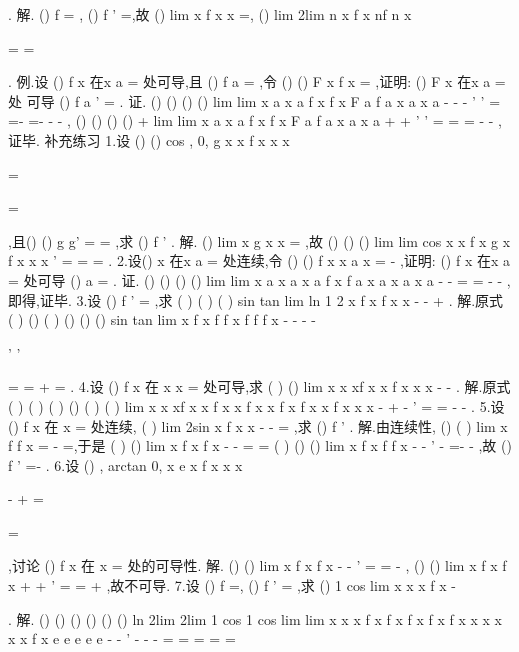 . 
解.
()
f
=
,
()
f '
=,故
()
lim
x
f x
x
\to 
=,
()
lim
2lim
n
x
f x
nf
n
x
\to \infty 
\to 

=
=




. 
\textcolor{lyred}{例}.设
()
f x 在x
a
=
处可导,且
()
f a =
,令
()
()
F x
f x
=
,证明:
()
F x 在x
a
=
处 
可导
()
f
a
'
\Leftrightarrow 
=
. 
证.
()
()
()
()
lim
lim
x
a
x
a
f x
f x
F
a
f
a
x
a
x
a
-
-
-
\to 
\to 
'
'
=
=-
=-
-
-
, 
()
()
()
()
+
lim
lim
x
a
x
a
f x
f x
F
a
f
a
x
a
x
a
+
+
\to 
\to 
'
'
=
=
=
-
-
,证毕. 
\textcolor{lyred}{补充练习 }
1.设
()
()
cos
,
0,
g x
x
f x
x
x

\neq 

=

=

,且()
()
g
g'
=
=
,求
()
f '
. 
解.
()
lim
x
g x
x
\to 
=
,故
()
()
()
lim
lim
cos
x
x
f x
g x
f
x
x
x
\to 
\to 
'
=
=
=
. 
2.设()
x
\varphi 
在x
a
=
处连续,令
()
()
f x
x
a
x
\varphi 
=
-
,证明:
()
f x 在x
a
=
处可导\Leftrightarrow  
()
a
\varphi 
=
. 
证.
()
()
()
()
lim
lim
x
a
x
a
x
a
f x
f a
x
a
x
a
x
a \varphi 
\varphi 
\to 
\to 
-
-
=
=\pm 
-
-
,即得,证毕. 
3.设
()
f '
=
,求
(
)
(
)
(
)
sin
tan
lim
ln 1 2
x
f
x
f
x
x
\to 
-
-
+
. 
解.原式
(
)
()
(
)
()
()
()
sin
tan
lim
x
f
x
f
f
x
f
f
f
x
\to 
-
-
-
-


'
'


=
=
+
=
. 
4.设
()
f x 在
x
x
=
处可导,求
(
)
()
lim
x
x
xf x
x f x
x
x
\to 
-
-
. 
解.原式
(
)
(
)
(
)
()
(
)
(
)
lim
x
x
xf x
x f x
x f x
x f x
f x
x f
x
x
x
\to 
-
+
-
'
=
=
-
-
. 
5.设
()
f x 在
x =
处连续,
(
)
lim
2sin
x
f
x
x
\to 
-
-
=
,求
()
f '
. 
解.由连续性,
()
(
)
lim
x
f
f
x
\to 
=
-
=,于是
(
)
()
lim
x
f
x
f
x
\to 
-
-
=
= 
(
)
()
()
lim
x
f
x
f
f
x
\to 
-
-
'
-
=-
-
,故
()
f '
=-
. 
6.设
()
,
arctan
0,
x
e
x
f x
x
x

-
\neq 
+
=

=

,讨论
()
f x 在
x =
处的可导性. 
解.
()
()
lim
x
f x
f
x
\pi 
-
-
\to 
'
=
=
-
,
()
()
lim
x
f x
f
x
\pi 
+
+
\to 
'
=
=
+
,故不可导. 
7.设
()
f
=,
()
f '
=
,求
()
1 cos
lim
x
x
x
f x
-
\to 



. 
解.
()
()
()
()
()
()
ln
2lim
2lim
1 cos
1 cos
lim
lim
x
x
x
f x
f x
f x
f
x
f
x
x
x
x
x
x
f x
e
e
e
e
e
\to 
\to 
-
-
'
-
-
-
\to 
\to 
=
=
=
=
=




